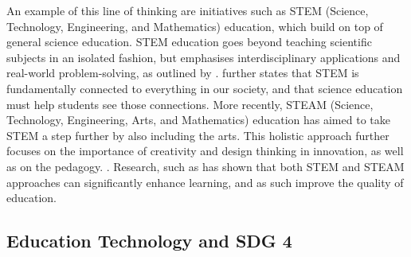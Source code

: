 An example of this line of thinking are initiatives such as STEM (Science, Technology, Engineering, and Mathematics) education, which build on top of general science education. STEM education goes beyond teaching scientific subjects in an isolated fashion, but emphasises interdisciplinary applications and real-world problem-solving, as outlined by \citet{bybee_case_2013, xie_stem_2015, blackley_stem_2015, abdi_tracing_2024}. \citet{deville_stem_2024} further states that STEM is fundamentally connected to everything in our society, and that science education must help students see those connections. More recently, STEAM (Science, Technology, Engineering, Arts, and Mathematics) education has aimed to take STEM a step further by also including the arts. This holistic approach further focuses on the importance of creativity and design thinking in innovation, as well as on the pedagogy. \citep{marin-marin_steam_2021, dolgopolovas_computational_2021, connor_stem_2015, bequette_place_2012}. Research, such as \citet{jamali_role_2023, yakman_exploring_2012, samsudin_effect_2020} has shown that both STEM and STEAM approaches can significantly enhance learning, and as such improve the quality of education.

\subsection{\label{sec:intro_et}Education Technology and SDG 4}%

